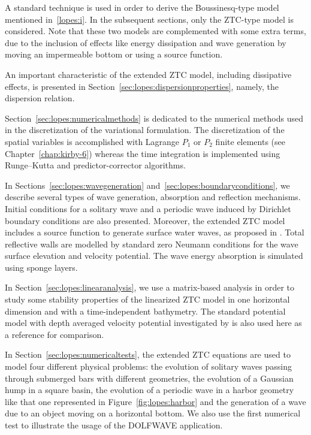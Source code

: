 A standard technique is used in order to derive the Boussinesq-type
model mentioned in~\ref{lopes:i}.  In the subsequent sections, only
the ZTC-type model is considered.  Note that these two models are
complemented with some extra terms, due to the inclusion of effects
like energy dissipation and wave generation by moving an impermeable
bottom or using a source function.

An important characteristic of the extended ZTC model, including
dissipative effects, is presented in
Section~\ref{sec:lopes:dispersionproperties}, namely, the dispersion
relation.

\enlargethispage{10pt}

Section~\ref{sec:lopes:numericalmethods} is dedicated to the numerical
methods used in the discretization of the variational formulation.
The discretization of the spatial variables is accomplished with
Lagrange $P_1$ or $P_2$ finite elements (see
Chapter~\ref{chap:kirby-6}) whereas the time integration is
implemented using Runge--Kutta and predictor-corrector algorithms.

In Sections~\ref{sec:lopes:wavegeneration}
and~\ref{sec:lopes:boundaryconditions}, we describe several types of
wave generation, absorption and reflection mechanisms. Initial
conditions for a solitary wave and a periodic wave induced by
Dirichlet boundary conditions are also presented. Moreover, the
extended ZTC model includes a source function to generate surface
water waves, as proposed in \citet{WeiKirbySinha1999}. Total
reflective walls are modelled by standard zero Neumann conditions for
the wave surface elevation and velocity potential.  The wave energy
absorption is simulated using sponge layers.

In Section~\ref{sec:lopes:linearanalysis}, we use a matrix-based
analysis in order to study some stability properties of the linearized
ZTC model in one horizontal dimension and with a time-independent
bathymetry. The standard potential model with depth averaged velocity
potential investigated by \citet{LovholtPedersen2009} is also used
here as a reference for comparison.

In Section~\ref{sec:lopes:numericaltests}, the extended ZTC equations
are used to model four different physical problems: the evolution of
solitary waves passing through submerged bars with different
geometries, the evolution of a Gaussian hump in a square basin, the
evolution of a periodic wave in a harbor geometry like that one
represented in Figure~\ref{fig:lopes:harbor} and the generation of a
wave due to an object moving on a horizontal bottom. We also use the
first numerical test to illustrate the usage of the DOLFWAVE
application.

